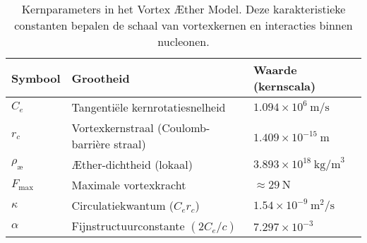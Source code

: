 \begin{table}[h!]
    \centering
    \begin{tabular}{lll}
        \hline
        Symbool & Grootheid & Waarde (kernscala)\\
        \hline
        $C_e$ & Tangentiële kernrotatiesnelheid & $1.094\times10^6~\text{m/s}$\\
        $r_c$ & Vortexkernstraal (Coulomb-barrière straal) & $1.409\times10^{-15}~\text{m}$\\
        $\rho_\text{\ae}$ & Æther-dichtheid (lokaal) & $3.893\times10^{18}~\text{kg/m}^3$\\
        $F_{\max}$ & Maximale vortexkracht & $\approx 29~\text{N}$\\
        $\kappa$ & Circulatiekwantum ($C_e r_c$) & $1.54\times10^{-9}~\text{m}^2/\text{s}$\\
        $\alpha$ & Fijnstructuurconstante $(2C_e/c)$ & $7.297\times10^{-3}$\\
        \hline
    \end{tabular}
    \caption{Kernparameters in het Vortex Æther Model. Deze karakteristieke constanten bepalen de schaal van vortexkernen en interacties binnen nucleonen.}
\end{table}